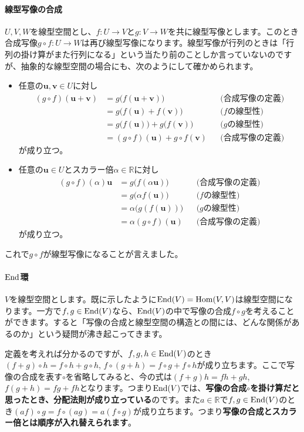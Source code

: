 \paragraph{線型写像の合成}
$U, V, W$を線型空間とし、$f\colon U\rightarrow V$と$g\colon V\rightarrow W$を共に線型写像とします。このとき合成写像$g\circ f\colon U\rightarrow W$は再び線型写像になります。線型写像が行列のときは「行列の掛け算がまた行列になる」という当たり前のことしか言っていないのですが、抽象的な線型空間の場合にも、次のようにして確かめられます。
\begin{itemize}
\item 任意の$\bm{u}, \bm{v}\in U$に対し
\begin{align*}
(g\circ f)(\bm{u} + \bm{v}) &= g\bigl(f(\bm{u} + \bm{v})\bigr) & & \text{(合成写像の定義)} \\
&= g\bigl(f(\bm{u}) + f(\bm{v})\bigr) & & \text{($f$の線型性)} \\
&= g\bigl(f(\bm{u})\bigr) + g\bigl(f(\bm{v})\bigr) & & \text{($g$の線型性)} \\
&= (g\circ f)(\bm{u}) + g\circ f(\bm{v}) & & \text{(合成写像の定義)}
\end{align*}
が成り立つ。
\item 任意の$\bm{u}\in U$とスカラー倍$\alpha \in\mathbb{R}$に対し
\begin{align*}
(g\circ f)(\alpha) \bm{u} &= g\bigl(f(\alpha\bm{u})\bigr) & & \text{(合成写像の定義)} \\
&= g\bigl(\alpha f(\bm{u})\bigr) & & \text{($f$の線型性)} \\
&= \alpha \bigl(g(f(\bm{u}))\bigr) & & \text{($g$の線型性)} \\
&= \alpha (g\circ f)(\bm{u}) & & \text{(合成写像の定義)}
\end{align*}
が成り立つ。
\end{itemize}
これで$g\circ f$が線型写像になることが言えました。

\paragraph{$\operatorname{End}$環}

$V$を線型空間とします。既に示したように$\operatorname{End}(V) = \operatorname{Hom}(V, V)$は線型空間になります。一方で$f, g\in\operatorname{End}(V)$なら、$\operatorname{End}(V)$の中で写像の合成$f \circ g$を考えることができます。すると「写像の合成と線型空間の構造との間には、どんな関係があるのか」という疑問が沸き起こってきます。

定義を考えれば分かるのですが、$f, g, h\in\operatorname{End}(V)$のとき$(f + g) \circ h = f\circ h + g \circ h$, $f \circ (g + h) = f \circ g + f \circ h$が成り立ちます。ここで写像の合成を表す$\circ$を省略してみると、今の式は$(f + g)h = fh + gh$, $f(g + h) = fg + fh$となります。つまり$\operatorname{End}(V)$では、\textbf{写像の合成$\circ$を掛け算だと思ったとき、分配法則が成り立っている}のです。また$a\in\mathbb{R}$で$f, g\in\operatorname{End}(V)$のとき$(af)\circ g = f \circ (ag) = a(f\circ g)$が成り立ちます。つまり\textbf{写像の合成とスカラー倍とは順序が入れ替えられます}。

